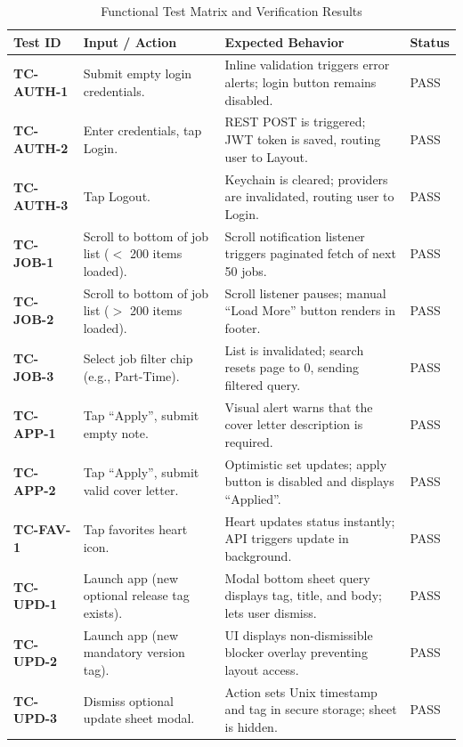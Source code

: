 \begin{table}[htbp]
\centering
\caption{Functional Test Matrix and Verification Results}
\label{tab:functional_tests}
\begin{tabular}{|l|p{4cm}|p{5cm}|l|}
\hline
\textbf{Test ID} & \textbf{Input / Action} & \textbf{Expected Behavior} & \textbf{Status} \\ \hline
\textbf{TC-AUTH-1} & Submit empty login credentials. & Inline validation triggers error alerts; login button remains disabled. & PASS \\ \hline
\textbf{TC-AUTH-2} & Enter credentials, tap Login. & REST POST is triggered; JWT token is saved, routing user to Layout. & PASS \\ \hline
\textbf{TC-AUTH-3} & Tap Logout. & Keychain is cleared; providers are invalidated, routing user to Login. & PASS \\ \hline
\textbf{TC-JOB-1} & Scroll to bottom of job list ($<$ 200 items loaded). & Scroll notification listener triggers paginated fetch of next 50 jobs. & PASS \\ \hline
\textbf{TC-JOB-2} & Scroll to bottom of job list ($>$ 200 items loaded). & Scroll listener pauses; manual ``Load More'' button renders in footer. & PASS \\ \hline
\textbf{TC-JOB-3} & Select job filter chip (e.g., Part-Time). & List is invalidated; search resets page to 0, sending filtered query. & PASS \\ \hline
\textbf{TC-APP-1} & Tap ``Apply'', submit empty note. & Visual alert warns that the cover letter description is required. & PASS \\ \hline
\textbf{TC-APP-2} & Tap ``Apply'', submit valid cover letter. & Optimistic set updates; apply button is disabled and displays ``Applied''. & PASS \\ \hline
\textbf{TC-FAV-1} & Tap favorites heart icon. & Heart updates status instantly; API triggers update in background. & PASS \\ \hline
\textbf{TC-UPD-1} & Launch app (new optional release tag exists). & Modal bottom sheet query displays tag, title, and body; lets user dismiss. & PASS \\ \hline
\textbf{TC-UPD-2} & Launch app (new mandatory version tag). & UI displays non-dismissible blocker overlay preventing layout access. & PASS \\ \hline
\textbf{TC-UPD-3} & Dismiss optional update sheet modal. & Action sets Unix timestamp and tag in secure storage; sheet is hidden. & PASS \\ \hline

\end{tabular}
\end{table}

